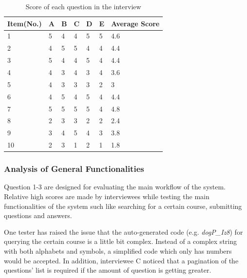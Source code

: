 \begin{table}[!htbp]
\centering
\begin{tabularx}{\textwidth}{@{}lXXXXXl@{}}
\toprule
Item(No.)       & A  & B  & C  & D  & E          & Average Score        \\ \midrule
1               & 5  & 4  & 4  & 5  & 5          & 4.6                     \\
2               & 4  & 5  & 5  & 4  & 4          & 4.4                     \\
3               & 5  & 4  & 4  & 5  & 4          & 4.4                     \\
4               & 4  & 3  & 4  & 3  & 4          & 3.6                    \\
5               & 4  & 3  & 3  & 3  & 2          & 3                     \\
6               & 4  & 5  & 4  & 5  & 4          & 4.4                     \\
7               & 5  & 5  & 5  & 5  & 4          & 4.8                     \\
8               & 2  & 3  & 3  & 2  & 2          & 2.4                     \\
9               & 3  & 4  & 5  & 4  & 3          & 3.8                     \\
10               & 2  & 3  & 1  & 2  & 1          & 1.8                     \\ \bottomrule    
\end{tabularx}
\caption{Score of each question in the interview}
\label{table:score-interview}
\end{table}

\subsubsection{Analysis of General Functionalities}
Question 1-3 are designed for evaluating the main workflow of the system. Relative high scores are made by interviewees while testing the main functionalities of the system such like searching for a certain course, submitting questions and answers.

One tester has raised the issue that the auto-generated code (e.g. \textit{dogP\_Iz8}) for querying the certain course is a little bit complex. Instead of a complex string with both alphabets and symbols, a simplified code which only has numbers would be accepted. In addition, interviewee C noticed that a pagination of the questions' list is required if the amount of question is getting greater.

